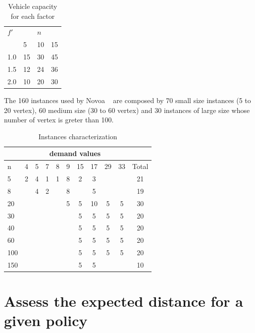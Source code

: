 \begin{table}
  \centering
  \caption{Vehicle capacity for each factor}\label{tb:Q}
\begin{tabular}{l l l l}
  \hline
  $f'$ &   & $n$ &   \\
  \cline{2-4}
      & 5 & 10 & 15 \\
  \hline
  1.0 & 15 & 30 & 45 \\
  1.5 & 12 & 24 & 36 \\
  2.0 & 10 & 20 & 30 \\
  \hline
\end{tabular}
\end{table}

The 160 instances used by Novoa ~\cite{novoa_approximate_2009} are composed by 70 small size instances (5 to 20 vertex), 60 medium size (30 to 60 vertex) and 30 instances of large size whose number of vertex is greter than 100.


\begin{table}
\centering
\begin{tabular}{| l | c c c c c c c c c | c |}
\hline
 & \multicolumn{9}{c|}{demand values} & \\ 
\hline
n & 4 & 5 & 7 & 8 & 9 & 15 & 17 & 29 & 33 & Total \\
\hline
5 & 2 & 4 & 1 & 1 & 8 & 2 & 3 &  &  & 21 \\ 
8 &  & 4 & 2 &  & 8 &  & 5 &  &  & 19 \\ 
20 &  &  &  &  & 5 & 5 & 10 & 5 & 5 & 30 \\ 
30 &  &  &  &  &  & 5 & 5 & 5 & 5 & 20 \\ 
40 &  &  &  &  &  & 5 & 5 & 5 & 5 & 20 \\ 
60 &  &  &  &  &  & 5 & 5 & 5 & 5 & 20 \\ 
100 &  &  &  &  &  & 5 & 5 & 5 & 5 & 20 \\ 
150 &  &  &  &  &  & 5 & 5 &  &  & 10 \\ 
\hline
\end{tabular}
\caption{Instances characterization}\label{tb:instances_characterization}
\end{table}



\section{Assess the expected distance for a given policy}

